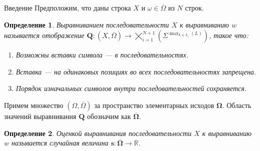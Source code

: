 \documentclass[ucs, notheorems, handout, 10pt]{beamer}
\newtheorem{defenition}{Определение}
\begin{document}
	\begin{frame}{Введение}					
		Предположим, что даны строка $X$ и $\omega \in \overline{\Omega}$ из $N$ строк. 
		
		\begin{defenition}
			Выравниванием последовательности $X$ к выравниванию $w$ называется отображение $\boldsymbol{Q}: (X, \overline{\Omega}) \rightarrow \bigtimes_{i=1}^{N+1}(\Sigma^{\max_{L \in L_i}(L)})$, такое что:
			\begin{enumerate}
				\item Возможны вставки символа --- в последовательностях.
				\item Вставка --- на одинаковых позициях во всех последовательностях запрещена.
				\item Порядок изначальных символов внутри последовательностей сохраняется.
			\end{enumerate}
		\end{defenition}
		
		Примем множество $(\Omega, \overline \Omega)$ за пространство элементарных исходов $\boldsymbol{\Omega}$. Область значений выравнивания $\boldsymbol Q$ обозначим как $\overline{\boldsymbol{\Omega}}$.
		
		\begin{defenition}				
			Оценкой выравнивания последовательности $X$ к выравниванию $w$ называется случайная величина $\boldsymbol s:\overline{\boldsymbol{\Omega}} \rightarrow \mathbb{R}$.
		\end{defenition}				
		
	\end{frame}
\end{document}
